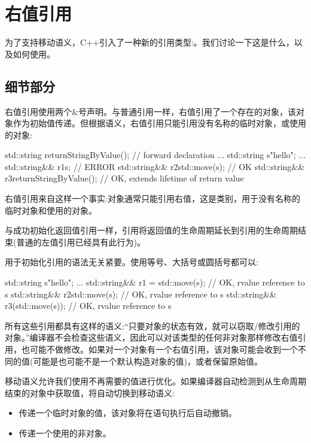 \section{右值引用}

为了支持移动语义，C++引入了一种新的引用类型:。我们讨论一下这是什么，以及如何使用。

\subsection{细节部分}

右值引用使用两个\&号声明。与普通引用一样，右值引用了一个存在的对象，该对象作为初始值传递。但根据语义，右值引用只能引用没有名称的临时对象，或使用的对象:

\begin{cppcode}
std::string returnStringByValue(); // forward declaration
...
std::string s{"hello"};
...
std::string&& r1{s}; // ERROR
std::string&& r2{std::move(s)}; // OK
std::string&& r3{returnStringByValue()}; // OK, extends lifetime of return value
\end{cppcode}

右值引用来自这样一个事实:对象通常只能引用右值，这是类别，用于没有名称的临时对象和使用的对象。

与成功初始化返回值引用一样，引用将返回值的生命周期延长到引用的生命周期结束(普通的左值引用已经具有此行为)。

用于初始化引用的语法无关紧要。使用等号、大括号或圆括号都可以:

\begin{cppcode}
std::string s{"hello"};
...
std::string&& r1 = std::move(s); // OK, rvalue reference to s
std::string&& r2{std::move(s)}; // OK, rvalue reference to s
std::string&& r3(std::move(s)); // OK, rvalue reference to s
\end{cppcode}

所有这些引用都具有这样的语义:“只要对象的状态有效，就可以窃取/修改引用的对象。”编译器不会检查这些语义，因此可以对该类型的任何非对象那样修改右值引用，也可能不做修改。如果对一个对象有一个右值引用，该对象可能会收到一个不同的值(可能是也可能不是一个默认构造对象的值)，或者保留原始值。

移动语义允许我们使用不再需要的值进行优化。如果编译器自动检测到从生命周期结束的对象中获取值，将自动切换到移动语义:

\begin{itemize}
	\item 传递一个临时对象的值，该对象将在语句执行后自动撤销。
	\item 传递一个使用的非对象。
\end{itemize}

